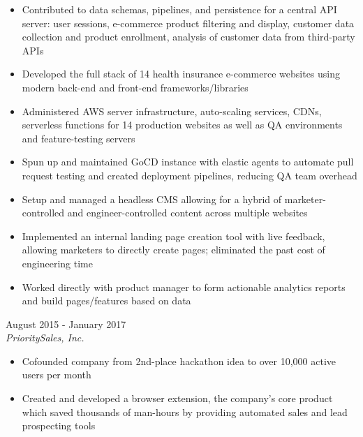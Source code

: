 \documentclass{resume}
\begin{document}
\begin{spacing}{1.2}
\begin{paracol}{2}
		\nointerlineskip
		\begin{itemize}
			\item Contributed to data schemas, pipelines, and persistence for a central API server: user sessions, e-commerce product filtering and display, customer data collection and product enrollment, analysis of customer data from third-party APIs
			\item Developed the full stack of 14 health insurance e-commerce websites using modern back-end and front-end frameworks/libraries
			\item Administered AWS server infrastructure, auto-scaling services, CDNs, serverless functions for 14 production websites as well as QA environments and feature-testing servers
			\item Spun up and maintained GoCD instance with elastic agents to automate pull request testing and created deployment pipelines, reducing QA team overhead
			\item Setup and managed a headless CMS allowing for a hybrid of marketer-controlled and engineer-controlled content across multiple websites
			\item Implemented an internal landing page creation tool with live feedback, allowing marketers to directly create pages; eliminated the past cost of engineering time
			\item Worked directly with product manager to form actionable analytics reports and build pages/features based on data
		\end{itemize}

		\medskip

		{\large{}}
		\hfill{\color{subcontent} August 2015 - January 2017}\\
		\textit{PrioritySales, Inc.}

		\nointerlineskip
		\begin{itemize}
			\item Cofounded company from 2nd-place hackathon idea to over 10,000 active users per month
			\item Created and developed a browser extension, the company’s core product which saved thousands of man-hours by providing automated sales and lead prospecting tools
		\end{itemize}
	\end{paracol}
\end{spacing}
\end{document}
